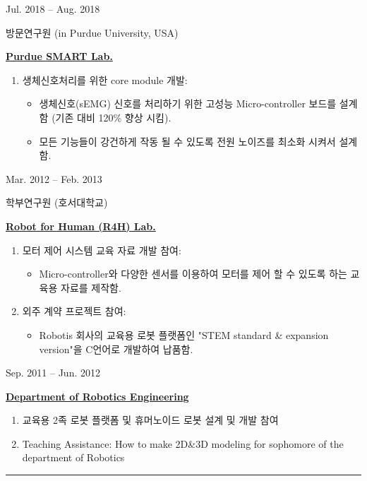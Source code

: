 \documentclass[a4paper,10pt]{article}
\newlength{\cvcolumngapwidth}
\newlength{\cvleftcolumnwidth}
\newlength{\cvrightcolumnwidth}
\newcommand{\cvsectionstyle}[1]{{\normalsize\cvsectionfont\textcolor{cvsectioncolor}{#1}}}
\newcommand{\cvtitlestyle}[1]{{\large\cvtitlefont\textcolor{cvtitlecolor}{#1}}}
\newcommand{\cvdurationstyle}[1]{{\small\cvdurationfont\textcolor{cvdurationcolor}{#1}}}
\newlength{\cvafteritemskipamount}
\newlength{\cvaftersectionskipamount}
\newlength{\cvaftertitleskipamount}
\newlength{\cvparskip}
\newcommand{\cvsection}[1]{
    \begin{minipage}[t]{\cvleftcolumnwidth}
        \raggedleft\cvsectionstyle{#1}
    \end{minipage}%
    \hspace{\cvcolumngapwidth}%
    \begin{minipage}[t]{\cvrightcolumnwidth}
        \textcolor{cvrulecolor}{\rule{\cvrightcolumnwidth}{0.3mm}}
    \end{minipage}

    \vspace{\cvaftersectionskipamount}
}
\newcommand{\cvitem}[2]{
    \begin{minipage}[t]{\cvleftcolumnwidth}
        \raggedleft #1
    \end{minipage}%
    \hspace{\cvcolumngapwidth}%
    \begin{minipage}[t]{\cvrightcolumnwidth}
        \setlength{\parskip}{\cvparskip} #2
    \end{minipage}

    \vspace{\cvafteritemskipamount}
}
\newcommand{\cvtitle}[1]{
    \cvtitlestyle{#1}

    \vspace{\cvaftertitleskipamount}
    \vspace{-\cvparskip}
}
\begin{document}
\cvitem{
    \cvdurationstyle{Jul. 2018 -- Aug. 2018}
}{
    \cvtitle{방문연구원 (in Purdue University, USA)} 
    \item \underline{\textbf{Purdue SMART Lab.}}
    \begin{enumerate}[leftmargin=*]
        \item 생체신호처리를 위한 core module 개발:
        \begin{itemize}
            \item 생체신호(sEMG) 신호를 처리하기 위한 고성능 Micro-controller 보드를 설계함 (기존 대비 120\% 향상 시킴).
            \item 모든 기능들이 강건하게 작동 될 수 있도록 전원 노이즈를 최소화 시켜서 설계함.
        \end{itemize}
    \end{enumerate}
}


\cvitem{
    \cvdurationstyle{Mar. 2012 -- Feb. 2013}
}{
    \cvtitle{학부연구원 (호서대학교)}
    \underline{\textbf{Robot for Human (R4H) Lab.}}
    \begin{enumerate}[leftmargin=*]
        \item 모터 제어 시스템 교육 자료 개발 참여:
        \begin{itemize}
            \item Micro-controller와 다양한 센서를 이용하여 모터를 제어 할 수 있도록 하는 교육용 자료를 제작함.
        \end{itemize}
        \item 외주 계약 프로젝트 참여: 
        \begin{itemize}
            \item Robotis 회사의 교육용 로봇 플랫폼인 "STEM standard \& expansion version"을 C언어로 개발하여 납품함.
        \end{itemize}
    \end{enumerate}
}

\cvitem{
    \cvdurationstyle{Sep. 2011 -- Jun. 2012}    
}{
    \underline {\textbf{Department of Robotics Engineering}}
    \begin{enumerate}[leftmargin=*]
        \item 교육용 2족 로봇 플랫폼 및 휴머노이드 로봇 설계 및 개발 참여
        \item Teaching Assistance: How to make 2D\&3D modeling for sophomore of the department of Robotics
    \end{enumerate}
    }

\cvsection{Awards and Honors}
\end{document}
